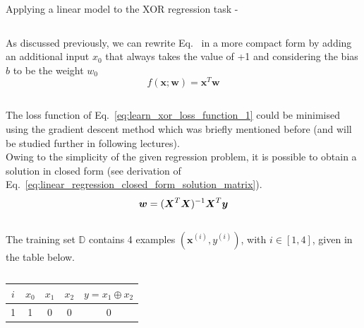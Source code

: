 \begin{frame}[t,allowframebreaks]{
    Applying a linear model to the XOR regression task -}
\begin{columns}[t]
\begin{column}{0.50\textwidth}
            As discussed previously, we can rewrite 
            Eq.~\label{eq:learn_xor_linear_model_1}
            in a more compact form by adding an additional 
            input $x_0$ that always takes the value of +1 
            and considering the bias $b$ to be the weight $w_0$
            \begin{equation}
                f(\mathbf{x};\mathbf{w}) = \mathbf{x}^{T} \mathbf{w}
                \label{eq:learn_xor_linear_model_2}
            \end{equation}
        \end{column}
    \end{columns}
      
    \framebreak


    The \gls{loss function} 
    of Eq.~\ref{eq:learn_xor_loss_function_1} 
    could be minimised using the 
    \gls{gradient descent} 
    method which was briefly mentioned before 
    (and will be studied further in following lectures).\\
    \vspace{0.1cm}
    Owing to the simplicity of the given 
    \gls{regression} problem, 
    it is possible to obtain a solution in closed form 
    (see derivation of 
    Eq.~\ref{eq:linear_regression_closed_form_solution_matrix}).\\
    \vspace{-0.2cm}
    \begin{equation*}
        \boldsymbol{w} = (\boldsymbol{X}^T \boldsymbol{X})^{-1} \boldsymbol{X}^T \boldsymbol{y}
    \end{equation*}\\
    \vspace{0.1cm}
    The training set $\mathbb{D}$ contains 4 examples 
    $(\mathbf{x}^{(i)},y^{(i)})$, with $i \in [1,4]$, given in the table below.\\
    \vspace{0.1cm}
    \begin{columns}[t]
        \begin{column}{0.44\textwidth}
            \vspace{-0.6cm}
            \begin{center}
                \begin{tabular}{ c | c c c | c }
                 $i$ & $x_0$ & $x_1$ & $x_2$ & $y = x_1 \oplus x_2$ \\ 
                 \hline
                 1 & 1 & 0 & 0 & 0 \\  

\end{tabular}
\end{center}
\end{column}
\end{columns}
\end{frame}
